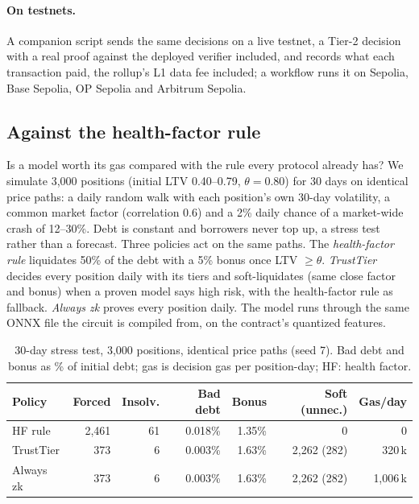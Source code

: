 \documentclass[sigconf,nonacm]{acmart}
\begin{document}
\paragraph{On testnets.} A companion script sends the same decisions on a live testnet, a Tier-2 decision with a real proof against the deployed verifier included, and records what each transaction paid, the rollup's L1 data fee included; a workflow runs it on Sepolia, Base Sepolia, OP Sepolia and Arbitrum Sepolia. \leTestnetSentence

\subsection{Against the health-factor rule}
\label{sec:eval-hf}

Is a model worth its gas compared with the rule every protocol already has? We simulate 3,000 positions (initial LTV 0.40--0.79, $\theta=0.80$) for 30 days on identical price paths: a daily random walk with each position's own 30-day volatility, a common market factor (correlation 0.6) and a 2\% daily chance of a market-wide crash of 12--30\%. Debt is constant and borrowers never top up, a stress test rather than a forecast. Three policies act on the same paths. The \emph{health-factor rule} liquidates 50\% of the debt with a 5\% bonus once LTV $\ge\theta$. \emph{TrustTier} decides every position daily with its tiers and soft-liquidates (same close factor and bonus) when a proven model says high risk, with the health-factor rule as fallback. \emph{Always zk} proves every position daily. The model runs through the same ONNX file the circuit is compiled from, on the contract's quantized features.

\begin{table}[t]
  \caption{30-day stress test, 3,000 positions, identical price paths (seed 7). Bad debt and bonus as \% of initial debt; gas is decision gas per position-day; HF: health factor.}
  \label{tab:hf}
  \footnotesize
  \setlength{\tabcolsep}{2.5pt}
  \begin{tabular}{@{}lrrrrrr@{}}
    \toprule
    \textbf{Policy} & \textbf{Forced} & \textbf{Insolv.} & \textbf{Bad debt} & \textbf{Bonus} & \textbf{Soft (unnec.)} & \textbf{Gas/day} \\
    \midrule
    HF rule & 2,461 & 61 & 0.018\% & 1.35\% & 0 & 0 \\
    TrustTier & 373 & 6 & 0.003\% & 1.63\% & 2,262 (282) & 320\,k \\
    Always zk & 373 & 6 & 0.003\% & 1.63\% & 2,262 (282) & 1,006\,k \\
    \bottomrule
  \end{tabular}
\end{table}
\end{document}
